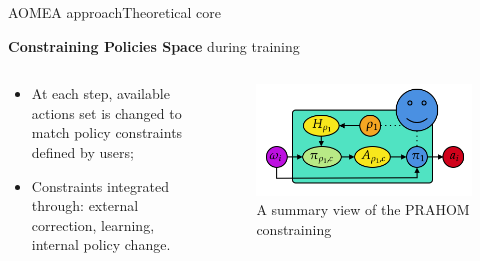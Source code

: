 \begin{frame}{AOMEA approach}{Theoretical core}

    \textbf{Constraining Policies Space} during training

    \begin{columns}

        \begin{column}{0.3\textwidth}

            \begin{itemize}
                \item At each step, available actions set is changed to match policy constraints defined by users;
                \item Constraints integrated through: external correction, learning, internal policy change.
            \end{itemize}

        \end{column}

        \begin{column}{0.8\textwidth}
            \begin{figure}
                \centering
                \includegraphics[width=0.7\linewidth]{figures/prahom_training_constrain.png}
                \caption{A summary view of the PRAHOM constraining}
                \label{fig:prahom_process}
            \end{figure}
        \end{column}

    \end{columns}

\end{frame}


